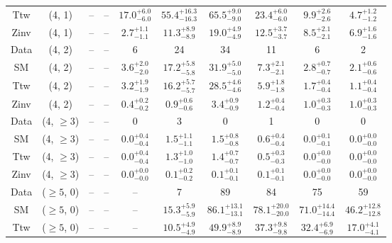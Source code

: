 \begin{table}[h!]
{\begin{tabular}{cccccccccc}
	Ttw & (4, 1) & -- & -- & $17.0^{+ 6.0 }_{- 6.0 }$ & $55.4^{+ 16.3 }_{- 16.3 }$ & $65.5^{+ 9.0 }_{- 9.0 }$ & $23.4^{+ 6.0 }_{- 6.0 }$ & $9.9^{+ 2.6 }_{- 2.6 }$ & $4.7^{+ 1.2 }_{- 1.2 }$ \\[0.5ex] 
	Zinv & (4, 1) & -- & -- & $2.7^{+ 1.1 }_{- 1.1 }$ & $11.3^{+ 8.9 }_{- 8.9 }$ & $19.0^{+ 4.9 }_{- 4.9 }$ & $12.5^{+ 3.7 }_{- 3.7 }$ & $8.5^{+ 2.1 }_{- 2.1 }$ & $6.9^{+ 1.6 }_{- 1.6 }$ \\[0.5ex] 
	Data & (4, 2) & -- & -- & 6 & 24 & 34 & 11 & 6 & 2 \\[0.5ex] 
	SM & (4, 2) & -- & -- & $3.6^{+ 2.0 }_{- 2.0 }$ & $17.2^{+ 5.8 }_{- 5.8 }$ & $31.9^{+ 5.0 }_{- 5.0 }$ & $7.3^{+ 2.1 }_{- 2.1 }$ & $2.8^{+ 0.7 }_{- 0.7 }$ & $2.1^{+ 0.6 }_{- 0.6 }$ \\[0.5ex] 
	Ttw & (4, 2) & -- & -- & $3.2^{+ 1.9 }_{- 1.9 }$ & $16.2^{+ 5.7 }_{- 5.7 }$ & $28.5^{+ 4.6 }_{- 4.6 }$ & $5.9^{+ 1.8 }_{- 1.8 }$ & $1.7^{+ 0.4 }_{- 0.4 }$ & $1.1^{+ 0.4 }_{- 0.4 }$ \\[0.5ex] 
	Zinv & (4, 2) & -- & -- & $0.4^{+ 0.2 }_{- 0.2 }$ & $0.9^{+ 0.6 }_{- 0.6 }$ & $3.4^{+ 0.9 }_{- 0.9 }$ & $1.2^{+ 0.4 }_{- 0.4 }$ & $1.0^{+ 0.3 }_{- 0.3 }$ & $1.0^{+ 0.3 }_{- 0.3 }$ \\[0.5ex] 
	Data & (4, $\ge3$) & -- & -- & 0 & 3 & 0 & 1 & 0 & 0 \\[0.5ex] 
	SM & (4, $\ge3$) & -- & -- & $0.0^{+ 0.4 }_{- 0.4 }$ & $1.5^{+ 1.1 }_{- 1.1 }$ & $1.5^{+ 0.8 }_{- 0.8 }$ & $0.6^{+ 0.4 }_{- 0.4 }$ & $0.0^{+ 0.1 }_{- 0.1 }$ & $0.0^{+ 0.0 }_{- 0.0 }$ \\[0.5ex] 
	Ttw & (4, $\ge3$) & -- & -- & $0.0^{+ 0.4 }_{- 0.4 }$ & $1.3^{+ 1.0 }_{- 1.0 }$ & $1.4^{+ 0.7 }_{- 0.7 }$ & $0.5^{+ 0.3 }_{- 0.3 }$ & $0.0^{+ 0.0 }_{- 0.0 }$ & $0.0^{+ 0.0 }_{- 0.0 }$ \\[0.5ex] 
	Zinv & (4, $\ge3$) & -- & -- & $0.0^{+ 0.0 }_{- 0.0 }$ & $0.1^{+ 0.2 }_{- 0.2 }$ & $0.1^{+ 0.1 }_{- 0.1 }$ & $0.1^{+ 0.1 }_{- 0.1 }$ & $0.0^{+ 0.0 }_{- 0.0 }$ & $0.0^{+ 0.0 }_{- 0.0 }$ \\[0.5ex] 
	Data & ($\ge5$, 0) & -- & -- & -- & 7 & 89 & 84 & 75 & 59 \\[0.5ex] 
	SM & ($\ge5$, 0) & -- & -- & -- & $15.3^{+ 5.9 }_{- 5.9 }$ & $86.1^{+ 13.1 }_{- 13.1 }$ & $78.1^{+ 20.0 }_{- 20.0 }$ & $71.0^{+ 14.4 }_{- 14.4 }$ & $46.2^{+ 12.8 }_{- 12.8 }$ \\[0.5ex] 
	Ttw & ($\ge5$, 0) & -- & -- & -- & $10.5^{+ 4.9 }_{- 4.9 }$ & $49.9^{+ 8.9 }_{- 8.9 }$ & $37.3^{+ 9.8 }_{- 9.8 }$ & $32.4^{+ 6.9 }_{- 6.9 }$ & $17.0^{+ 4.1 }_{- 4.1 }$ \\[0.5ex] 

\end{tabular}}
\end{table}

